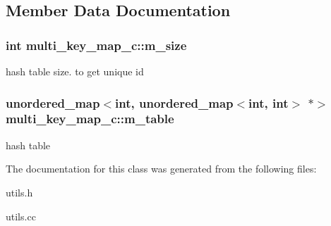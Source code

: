 \subsection{Member Data Documentation}
\hypertarget{classmulti__key__map__c_ad69aed9994fc585d4b4ef41f283995eb}{
\subsubsection[{m\_\-size}]{\setlength{\rightskip}{0pt plus 5cm}int {\bf multi\_\-key\_\-map\_\-c::m\_\-size}}}
\label{classmulti__key__map__c_ad69aed9994fc585d4b4ef41f283995eb}
hash table size. to get unique id \hypertarget{classmulti__key__map__c_aba1b2934d007b3e4bd2c841c674b83e0}{
\subsubsection[{m\_\-table}]{\setlength{\rightskip}{0pt plus 5cm}unordered\_\-map$<$int, unordered\_\-map$<$int, int$>$ $\ast$$>$ {\bf multi\_\-key\_\-map\_\-c::m\_\-table}}}
\label{classmulti__key__map__c_aba1b2934d007b3e4bd2c841c674b83e0}
hash table 

The documentation for this class was generated from the following files:\begin{DoxyCompactItemize}
\item 
utils.h\item 
utils.cc\end{DoxyCompactItemize}
